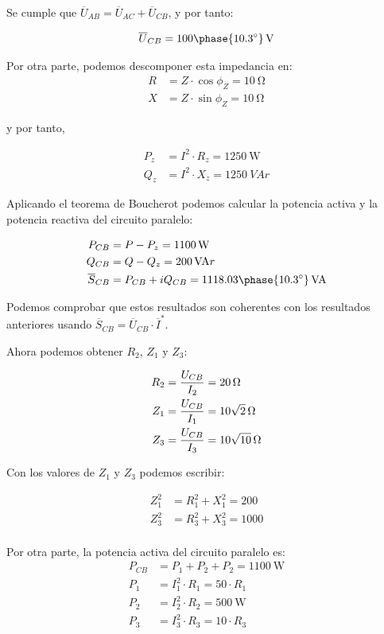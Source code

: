 \documentclass[12pt]{article}
\begin{document}
\begin{enumerate}[resume]
Se cumple que $\overline{U}_{AB} = \overline{U}_{AC} +
\overline{U}_{CB}$, y por tanto:

\[
\overline{U}_{CB} = \SI[parse-numbers=false]{100\phase{\ang{10.3}}}{\V}
\]

Por otra parte, podemos descomponer esta impedancia en:
\begin{align*}
  R &= Z \cdot \cos \phi_Z = \SI{10}{\ohm}\\
  X &= Z \cdot \sin \phi_Z = \SI{10}{\ohm}
\end{align*}

y por tanto,

\begin{align*}
P_z &= I^2 \cdot R_z = \SI{1250}{\watt}\\
Q_z &= I^2 \cdot X_z = \SI{1250}{VA}r
\end{align*}

Aplicando el teorema de Boucherot podemos calcular la potencia activa
y la potencia reactiva del circuito paralelo:

\begin{align*}
P_{CB} &= P - P_z = \SI{1100}{\watt}\\
Q_{CB} &= Q - Q_z = \SI{200}{VA}r\\
\overline{S}_{CB} &= P_{CB} + i Q_{CB} = \SI[parse-numbers=false]{1118.03\phase{\ang{10.3}}}{VA}
\end{align*}

Podemos comprobar que estos resultados son coherentes con los
resultados anteriores usando $\overline{S}_{CB} = \overline{U}_{CB}
\cdot \overline{I}^*$.


Ahora podemos obtener $R_2$, $Z_1$ y $Z_3$:

\begin{align*}
  R_2 &= \frac{U_{CB}}{I_2} = \SI{20}{\ohm}\\
  Z_1 &= \frac{U_{CB}}{I_1} = \SI[parse-numbers=false]{10\sqrt{2}}{\ohm}\\
  Z_3 &= \frac{U_{CB}}{I_3} = \SI[parse-numbers=false]{10\sqrt{10}}{\ohm}
\end{align*}

Con los valores de $Z_1$ y $Z_3$ podemos escribir:

\begin{align*}
  Z_1^2 &= R_1^2 + X_1^2 = 200\\
  Z_3^2 &= R_3^2 + X_3^2 = 1000\\
\end{align*}

Por otra parte, la potencia activa del circuito paralelo es:
\begin{align*}
  P_{CB} &= P_1 + P_2 + P_2 =\SI{1100}{\watt}\\
  P_1 &= I_1^2 \cdot R_1 = 50 \cdot R_1\\
  P_2 &= I_2^2 \cdot R_2 = \SI{500}{\watt}\\
  P_3 &= I_3^2 \cdot R_3 = 10 \cdot R_3
\end{align*}


\end{enumerate}
\end{document}
